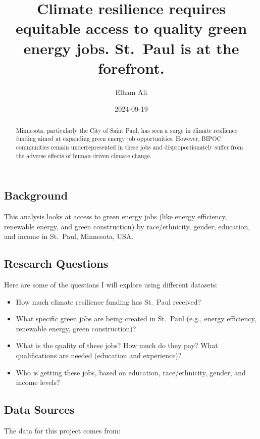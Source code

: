 \documentclass[
  letterpaper,
  DIV=11,
  numbers=noendperiod]{scrartcl}
\title{Climate resilience requires equitable access to quality green
energy jobs. St.~Paul is at the forefront.}
\author{Elham Ali}
\date{2024-09-19}
\providecommand{\tightlist}{%
  \setlength{\itemsep}{0pt}\setlength{\parskip}{0pt}}\usepackage{longtable,booktabs,array}
\begin{document}
\maketitle
\begin{abstract}
Minnesota, particularly the City of Saint Paul, has seen a surge in
climate resilience funding aimed at expanding green energy job
opportunities. However, BIPOC communities remain underrepresented in
these jobs and disproportionately suffer from the adverse effects of
human-driven climate change.
\end{abstract}

\subsection{Background}\label{background}

This analysis looks at access to green energy jobs (like energy
efficiency, renewable energy, and green construction) by race/ethnicity,
gender, education, and income in St.~Paul, Minnesota, USA.

\subsection{Research Questions}\label{research-questions}

Here are some of the questions I will explore using different datasets:

\begin{itemize}
\tightlist
\item
  How much climate resilience funding has St.~Paul received?
\item
  What specific green jobs are being created in St.~Paul (e.g., energy
  efficiency, renewable energy, green construction)?
\item
  What is the quality of these jobs? How much do they pay? What
  qualifications are needed (education and experience)?
\item
  Who is getting these jobs, based on education, race/ethnicity, gender,
  and income levels?
\end{itemize}

\subsection{Data Sources}\label{data-sources}

The data for this project comes from:
\end{document}
